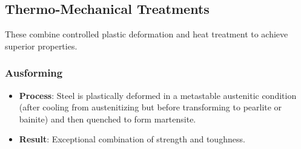 \subsection{Thermo-Mechanical Treatments}
These combine controlled plastic deformation and heat treatment to achieve superior properties.
\subsubsection{Ausforming}
\begin{itemize}
  \item \textbf{Process}: Steel is plastically deformed in a metastable austenitic condition (after cooling from austenitizing but before transforming to pearlite or bainite) and then quenched to form martensite.
  \item \textbf{Result}: Exceptional combination of strength and toughness.
\end{itemize}









